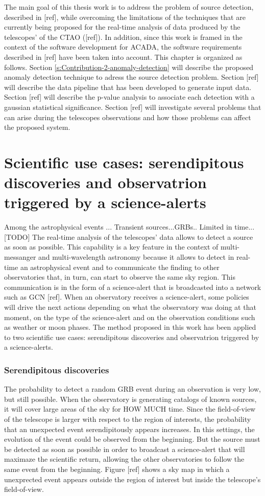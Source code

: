The main goal of this thesis work is to address the problem of source detection, described in [ref], while overcoming the limitations of the techniques that are currently being proposed for the real-time analysis of data produced by the telescopes' of the CTAO ([ref]). In addition, since this work is framed in the context of the software development for ACADA, the software requirements described in [ref] have been taken into account. This chapter is organized as follows. Section \autoref{s:Contribution-2-anomaly-detection} will describe the proposed anomaly detection technique to adress the source detection problem. Section [ref] will describe the data pipeline that has been developed to generate input data. Section [ref] will describe the p-value analysis to associate each detection with a gaussian statistical significance. Section [ref] will investigate several problems that can arise during the telescopes observations and how those problems can affect the proposed system. 

\section{Scientific use cases: serendipitous discoveries and observatrion triggered by a science-alerts}
\label{s:Contribution-2-ues-cases}
Among the astrophysical events ...
Transient sources...GRBs..
Limited in time... [TODO]
The real-time analysis of the telescopes' data allows to detect a source as soon as possible. This capability is a key feature in the context of multi-messanger and multi-wavelength astronomy because it allows to detect in real-time an astrophysical event and to communicate the finding to other observatories that, in turn, can start to observe the same sky region. This communication is in the form of a science-alert that is broadcasted into a network such as GCN [ref]. When an observatory receives a science-alert, some policies will drive the next actions depending on what the observatory was doing at that moment, on the type of the science-alert and on the observation conditions such as weather or moon phases. The method proposed in this work has been applied to two scientific use cases: serendipitous discoveries and observatrion triggered by a science-alerts. 

\subsubsection{Serendipitous discoveries}
The probability to detect a random GRB event during an observation is very low, but still possible. When the observatory is generating catalogs of known sources, it will cover large areas of the sky for HOW MUCH time. Since the field-of-view of the telescope is larger with respect to the region of interests, the probability that an unexpected event serendipitously appears increases. In this settings, the evolution of the event could be observed from the beginning. But the source must be detected as soon as possible in order to broadcast a science-alert that will maximaze the scientific return, allowing the other observatories to follow the same event from the beginning. Figure [ref] shows a sky map in which a unexprected event appears outside the region of interest but inside the telescope's field-of-view.  

